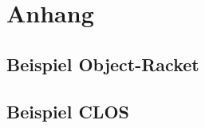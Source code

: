 \appendix
\chapter{Anhang}
\section{Beispiel Object-Racket}
\label{or-example}


\section{Beispiel CLOS}
\label{clos-example}
